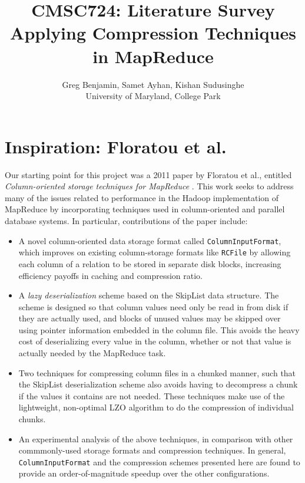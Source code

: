 \documentclass[twocolumn]{article}
\title{CMSC724: Literature Survey \\
Applying Compression Techniques in MapReduce}
\author{Greg Benjamin, Samet Ayhan, Kishan Sudusinghe \\
University of Maryland, College Park}
\date{}
\begin{document}
\maketitle

\section{Inspiration: Floratou et al.}

Our starting point for this project was a 2011 paper by Floratou et al., entitled
\emph{Column-oriented storage techniques for MapReduce} \cite{ref:floratou}.  This work
seeks to address many of the issues related to performance in the Hadoop implementation
of MapReduce by incorporating techniques used in column-oriented and parallel database
systems.  In particular, contributions of the paper include:

\begin{itemize}
\item A novel column-oriented data storage format called \verb+ColumnInputFormat+,
which improves on existing column-storage formats like \verb+RCFile+ \cite{ref:rcfile}
by allowing each column of a relation to be stored in separate disk blocks, increasing
efficiency payoffs in caching and compression ratio.
\item A \emph{lazy deserialization} scheme based on the SkipList \cite{ref:skiplist}
data structure.  The scheme is designed so that column values need only be read
in from disk if they are actually used, and blocks of unused values may be skipped
over using pointer information embedded in the column file.  This avoids the
heavy cost of deserializing every value in the column, whether or not that value
is actually needed by the MapReduce task.
\item Two techniques for compressing column files in a chunked manner, such that
the SkipList deserialization scheme also avoids having to decompress a chunk if
the values it contains are not needed.  These techniques make use of the lightweight,
non-optimal LZO algorithm \cite{ref:lzo} to do the compression of
individual chunks.
\item An experimental analysis of the above techniques, in comparison with other
commmonly-used storage formats and compression techniques.  In general, 
\verb+ColumnInputFormat+ and the compression schemes presented here are
found to provide an order-of-magnitude speedup over the other configurations.
\end{itemize}
\end{document}
